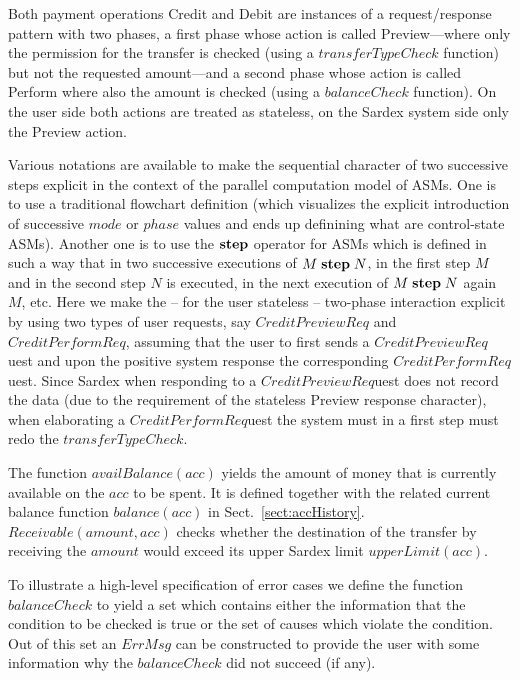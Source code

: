 Both payment operations Credit and Debit are instances of a request/response pattern with two phases, a first phase whose action is called Preview---where only the permission for the transfer is checked (using a $transferTypeCheck$ function) but not the requested amount---and  a second phase whose action is called Perform where also the amount is checked (using a $balanceCheck$ function). On the user side both actions are treated as stateless, on the Sardex system side only the Preview action. 

Various notations are available to make the sequential character of two successive steps explicit in the context of the parallel computation model of ASMs. One is to use a traditional flowchart definition (which visualizes the explicit introduction of successive $mode$ or $phase$ values and ends up definining what are control-state ASMs). Another one is to use the $\mathrel{\mathbf{step}}$ operator for ASMs which is defined in such a way that in two successive 
executions of $M \mathrel{\mathbf{step}} N$, in the first step $M$ and in the second step $N$ is executed, in the next execution of  $M \mathrel{\mathbf{step}} N $ again $M$, etc. Here we make the -- for the user stateless -- two-phase interaction explicit by using two  types of user requests, say $CreditPreviewReq$ and $CreditPerformReq$, assuming that the user to first sends a $CreditPreviewReq$uest and upon the positive system response the corresponding $CreditPerformReq$uest. Since Sardex when responding to a $CreditPreviewReq$uest does not record the data (due to the requirement of the stateless Preview response character), when elaborating a $CreditPerformReq$uest the system must in a first step must redo the $transferTypeCheck$. 

The function $availBalance(acc)$ yields the amount of money that is currently available on the $acc$ to be spent. It is defined together with the related current balance function $balance(acc)$ in Sect.~\ref{sect:accHistory}. $Receivable(amount,acc)$ checks whether the destination of the transfer by receiving the $amount$ would exceed its upper Sardex limit
$upperLimit(acc)$.

To illustrate a high-level specification of error cases we define the function $balanceCheck$ to yield a set which contains either the information that the condition to be checked is true or the set of causes which violate the condition. Out of this set an $ErrMsg$ can be constructed to provide the user with some information why the $balanceCheck$ did not succeed (if any). 

